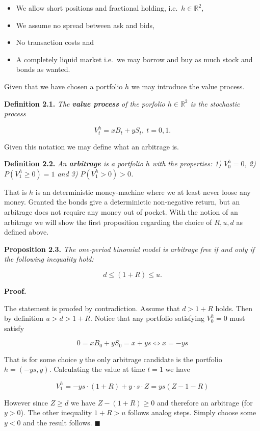 \documentclass[
]{article}
\providecommand{\tightlist}{%
  \setlength{\itemsep}{0pt}\setlength{\parskip}{0pt}}
\begin{document}
\begin{itemize}
\tightlist
\item
  We allow short positions and fractional holding,
  i.e.~\(h\in \mathbb{R}^2\),
\item
  We assume no spread between ask and bids,
\item
  No transaction costs and
\item
  A completely liquid market i.e.~we may borrow and buy as much stock
  and bonds as wanted.
\end{itemize}

Given that we have chosen a portfolio \(h\) we may introduce the value
process.

\textbf{Definition 2.1.} \emph{The \textbf{value process} of the
porfolio \(h\in\mathbb{R}^2\) is the stochastic process}

\[V^h_t=xB_t+yS_t,\ t=0,1.\]

Given this notation we may define what an arbitrage is.

\textbf{Definition 2.2.} \emph{An \textbf{arbitrage} is a portfolio
\(h\) with the properties: 1) \(V^h_0=0\), 2) \(P(V^h_1\ge 0)=1\) and 3)
\(P(V^h_1>0)>0\).}

That is \(h\) is an deterministic money-machine where we at least never
loose any money. Granted the bonds give a determinictic non-negative
return, but an arbitrage does not require any money out of pocket. With
the notion of an arbitrage we will show the first proposition regarding
the choice of \(R,u,d\) as defined above.

\textbf{Proposition 2.3.} \emph{The one-period binomial model is
arbitrage free if and only if the following inequality hold:}

\[d\le (1+R)\le u.\tag{2.1}\]

\textbf{Proof.}

The statement is proofed by contradiction. Assume that \(d>1+R\) holds.
Then by definition \(u>d>1+R\). Notice that any portfolio satisfying
\(V_0^h=0\) must satisfy

\[0=xB_0+yS_0=x+ys\iff x=-ys\]

That is for some choice \(y\) the only arbitrage candidate is the
portfolio \(h=(-ys,y)\). Calculating the value at time \(t=1\) we have

\[V_1^h=-ys\cdot(1+R)+y\cdot s\cdot Z=ys(Z-1-R)\]

However since \(Z\ge d\) we have \(Z-(1+R)\ge 0\) and therefore an
arbitrage (for \(y>0\)). The other inequality \(1+R>u\) follows analog
steps. Simply choose some \(y<0\) and the result follows.
\(\blacksquare\)
\end{document}
